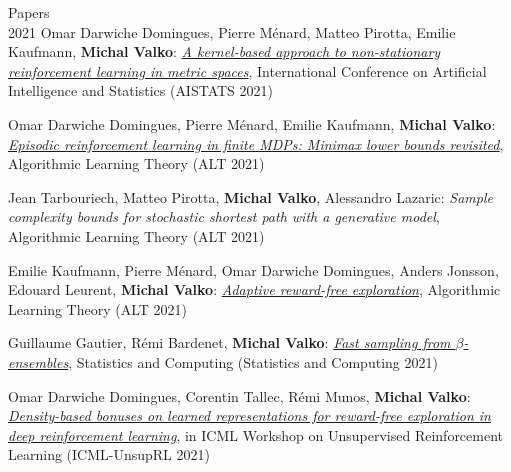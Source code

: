 \documentclass{resume}
\begin{document}
\begin{category}{Papers\\2021}
\citembullet
Omar Darwiche Domingues, Pierre M\'enard,  Matteo Pirotta, Emilie Kaufmann, {\bf Michal Valko}:
\href{https://arxiv.org/pdf/2007.05078.pdf}
{\emph{A kernel-based approach to non-stationary reinforcement learning in metric spaces}},
International Conference on Artificial Intelligence and Statistics
({\sf AISTATS 2021}) 


\citembullet
Omar Darwiche Domingues, Pierre M\'enard,  Emilie Kaufmann, {\bf Michal Valko}:
\href{https://arxiv.org/pdf/2010.03531.pdf}
{\emph{Episodic reinforcement learning in finite MDPs: Minimax lower bounds revisited}},
Algorithmic Learning Theory
({\sf ALT 2021}) 

\citembullet
Jean Tarbouriech, Matteo Pirotta, {\bf Michal Valko}, Alessandro Lazaric:
{\emph{Sample complexity bounds for stochastic shortest path with a generative model}},
Algorithmic Learning Theory
({\sf ALT 2021}) 


\citembullet
Emilie Kaufmann, Pierre M\' enard, Omar Darwiche Domingues, Anders Jonsson, Edouard Leurent, {\bf Michal Valko}:
\href{http://arxiv.org/abs/2006.06294}{\emph{Adaptive reward-free exploration}},
Algorithmic Learning Theory
({\sf ALT 2021}) 

\citembullet
Guillaume Gautier, R\' emi Bardenet, {\bf Michal Valko}:
\href{https://arxiv.org/pdf/2003.02344.pdf}
{\emph{Fast sampling from $\beta$-ensembles}},
Statistics and Computing
({\sf Statistics and Computing 2021}) 


\citembullet
Omar Darwiche Domingues, Corentin Tallec, R\' emi Munos,  {\bf Michal Valko}: 
\href{https://openreview.net/pdf?id=vRSY3L4Rlhp}{\emph{Density-based bonuses on learned representations for reward-free exploration in deep reinforcement learning}}, in 
 ICML Workshop on Unsupervised Reinforcement Learning
({\sf ICML-UnsupRL 2021}) 
\end{category}
\end{document}
